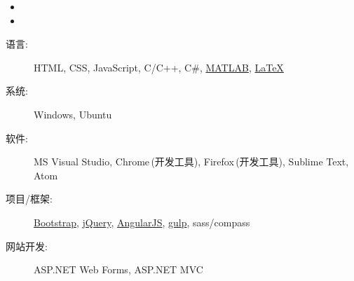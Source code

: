 \documentclass[letterpaper,11pt]{article}
\begin{document}
  \begin{itemize}
    \item
    \item
  \end{itemize}

  \begin{description}
    \item[语言:] HTML, CSS, JavaScript, C/C++, C\#, \href{http://cn.mathworks.com/products/matlab/}{MATLAB}, \href{http://www.latex-project.org/}{\LaTeX}
    \item[系统:] Windows, Ubuntu
    \item[软件:] MS Visual Studio, Chrome$\,$(开发工具), Firefox$\,$(开发工具), Sublime Text, Atom
    \item[项目/框架:] \href{http://www.bootcss.com/}{Bootstrap}, \href{https://jquery.com/}{jQuery}, \href{https://angularjs.org/}{AngularJS}, \href{http://gulpjs.com/}{gulp}, sass/compass
    \item[网站开发:] ASP.NET Web Forms, ASP.NET MVC
  \end{description}

\end{document}
